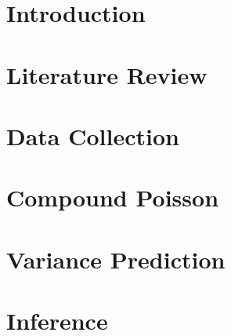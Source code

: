 \documentclass[12pt, a4paper]{memoir}
\begin{document}
\chapter{Introduction}


\chapter{Literature Review}


\chapter{Data Collection}

\chapter{Compound Poisson}


\chapter{Variance Prediction}


\chapter{Inference}





\begin{appendices}

\end{appendices}
\end{document}
